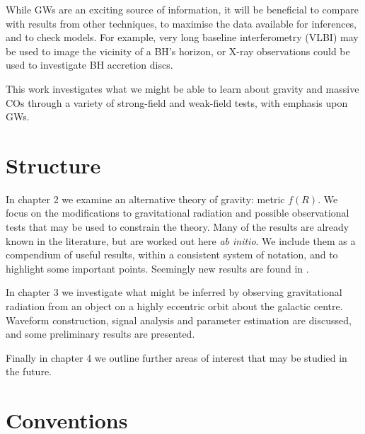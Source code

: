 While GWs are an exciting source of information, it will be beneficial to compare with results from other techniques, to maximise the data available for inferences, and to check models. For example, very long baseline interferometry (VLBI) may be used to image the vicinity of a BH's horizon, or X-ray observations could be used to investigate BH accretion discs\cite{Psaltis2008a}.

This work investigates what we might be able to learn about gravity and massive COs through a variety of strong-field and weak-field tests, with emphasis upon GWs.

\section{Structure}

In chapter 2 we examine an alternative theory of gravity: metric $f(R)$. We focus on the modifications to gravitational radiation and possible observational tests that may be used to constrain the theory. Many of the results are already known in the literature, but are worked out here {\it ab initio}. We include them as a compendium of useful results, within a consistent system of notation, and to highlight some important points. Seemingly new results are found in .

In chapter 3 we investigate what might be inferred by observing gravitational radiation from an object on a highly eccentric orbit about the galactic centre. Waveform construction, signal analysis and parameter estimation are discussed, and some preliminary results are presented.

Finally in chapter 4 we outline further areas of interest that may be studied in the future.

\section{Conventions}

